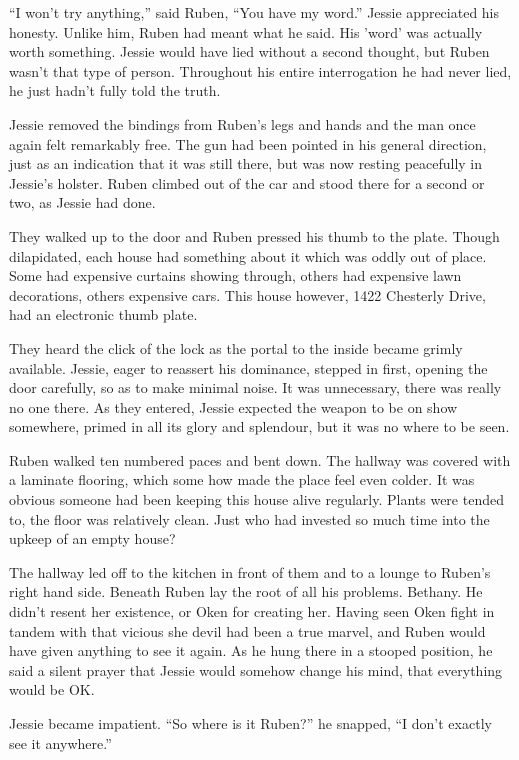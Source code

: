 ``I won't try anything,'' said Ruben, ``You have my word.''  Jessie appreciated his honesty.  Unlike him, Ruben had meant what he said.  His 'word' was actually worth something.  Jessie would have lied without a second thought, but Ruben wasn't that type of person.  Throughout his entire interrogation he had never lied, he just hadn't fully told the truth.

Jessie removed the bindings from Ruben's legs and hands and the man once again felt remarkably free.  The gun had been pointed in his general direction, just as an indication that it was still there, but was now resting peacefully in Jessie's holster.  Ruben climbed out of the car and stood there for a second or two, as Jessie had done.

They walked up to the door and Ruben pressed his thumb to the plate.  Though dilapidated, each house had something about it which was oddly out of place.  Some had expensive curtains showing through, others had expensive lawn decorations, others expensive cars.  This house however, 1422 Chesterly Drive, had an electronic thumb plate.

They heard the click of the lock as the portal to the inside became grimly available.  Jessie, eager to reassert his dominance, stepped in first, opening the door carefully, so as to make minimal noise.  It was unnecessary, there was really no one there.  As they entered, Jessie expected the weapon to be on show somewhere, primed in all its glory and splendour, but it was no where to be seen.

Ruben walked ten numbered paces and bent down.  The hallway was covered with a laminate flooring, which some how made the place feel even colder.  It was obvious someone had been keeping this house alive regularly.  Plants were tended to, the floor was relatively clean.  Just who had invested so much time into the upkeep of an empty house?

The hallway led off to the kitchen in front of them and to a lounge to Ruben's right hand side.  Beneath Ruben lay the root of all his problems.  Bethany.  He didn't resent her existence, or Oken for creating her.  Having seen Oken fight in tandem with that vicious she devil had been a true marvel, and Ruben would have given anything to see it again.  As he hung there in a stooped position, he said a silent prayer that Jessie would somehow change his mind, that everything would be OK.  

Jessie became impatient.  ``So where is it Ruben?'' he snapped, ``I don't exactly see it anywhere.''

